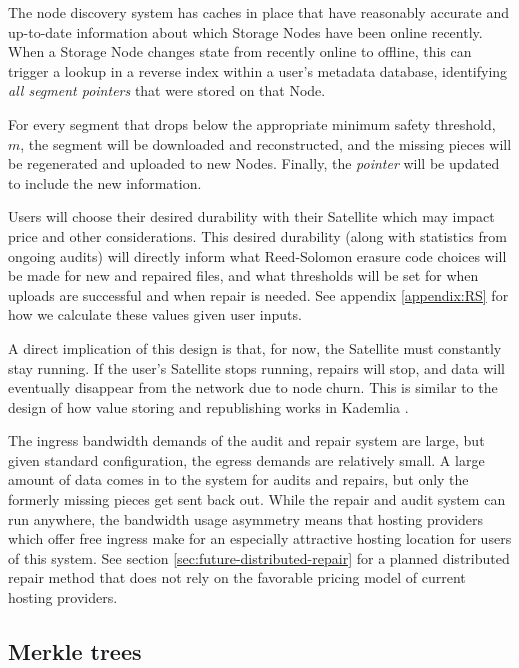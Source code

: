\documentclass[8pt,fleqn,openany]{book}
\begin{document}
The node discovery system has caches in place that have reasonably accurate and
up-to-date information about which Storage Nodes have been online recently.
When a Storage Node changes state from recently online to offline, this can
trigger a lookup in a reverse index within a user's metadata database, identifying
{\em all segment pointers} that were stored on that Node.

For every segment that drops below the appropriate minimum safety
threshold, $m$, the segment will be downloaded and reconstructed, and the
missing pieces will be regenerated and uploaded to new Nodes. Finally, the
{\em pointer} will be updated to include the new information.

Users will choose their desired durability with their Satellite
which may impact price and other considerations. This desired durability (along with
statistics from ongoing audits) will directly inform what Reed-Solomon erasure
code choices will be made for new and repaired files, and what thresholds
will be set for when uploads are successful and when repair is needed. See
appendix \ref{appendix:RS} for how we calculate these values given user inputs.

A direct implication of this design is that, for now, the Satellite must
constantly stay running. If the user's Satellite stops running, repairs will
stop, and data will eventually disappear from the network due to node churn.
This is similar to the design of how value storing and republishing works in
Kademlia \cite{kad}.

The ingress bandwidth demands of the audit and repair system are large, but
given standard configuration, the egress demands are relatively small.
A large amount of data comes in to the system for audits and repairs, but only
the formerly missing pieces get sent back out.
While the repair and audit system can run anywhere, the bandwidth usage
asymmetry means that hosting providers which offer free ingress
make for an especially attractive hosting location for users of this system.
See section \ref{sec:future-distributed-repair} for a planned distributed
repair method that
does not rely on the favorable pricing model of current hosting providers.

\subsection{Merkle trees}
\end{document}
